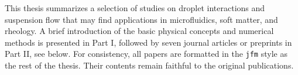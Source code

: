 %
\begin{preface}
	This thesis summarizes a selection of studies on droplet interactions and suspension flow
        that may find applications in microfluidics, soft matter, and rheology.
        A brief introduction of the basic physical concepts and numerical methods is presented in Part I,
        followed by seven journal articles or preprints in Part II, see below.
        For consistency, all papers are formatted in the \texttt{jfm} style as the rest of the thesis.
        Their contents remain faithful to the original publications.
\end{preface}


%
